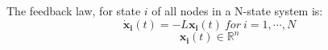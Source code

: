 \documentclass[a4paper, 12pt]{report}
\begin{document}
The feedback law, for state $i$ of all nodes in a N-state system is:
\[ \boldsymbol{\dot x_i}(t) = - L\boldsymbol{x_i}(t)\ for\ i=1, \cdots, N \]
\[\boldsymbol{x_i}(t) \in \mathbb{R}^n\]

%
\end{document}
